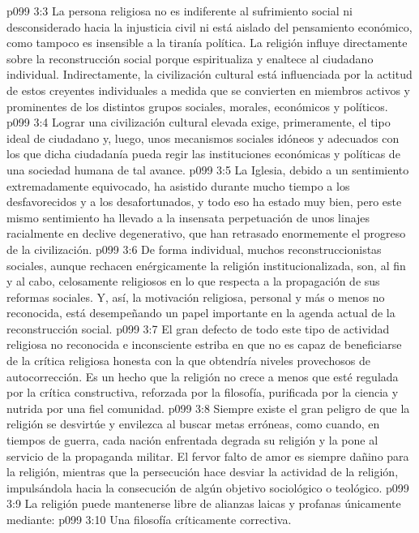 \vs p099 3:3 La persona religiosa no es indiferente al sufrimiento social ni desconsiderado hacia la injusticia civil ni está aislado del pensamiento económico, como tampoco es insensible a la tiranía política. La religión influye directamente sobre la reconstrucción social porque espiritualiza y enaltece al ciudadano individual. Indirectamente, la civilización cultural está influenciada por la actitud de estos creyentes individuales a medida que se convierten en miembros activos y prominentes de los distintos grupos sociales, morales, económicos y políticos.
\vs p099 3:4 \pc Lograr una civilización cultural elevada exige, primeramente, el tipo ideal de ciudadano y, luego, unos mecanismos sociales idóneos y adecuados con los que dicha ciudadanía pueda regir las instituciones económicas y políticas de una sociedad humana de tal avance.
\vs p099 3:5 La Iglesia, debido a un sentimiento extremadamente equivocado, ha asistido durante mucho tiempo a los desfavorecidos y a los desafortunados, y todo eso ha estado muy bien, pero este mismo sentimiento ha llevado a la insensata perpetuación de unos linajes racialmente en declive degenerativo, que han retrasado enormemente el progreso de la civilización.
\vs p099 3:6 De forma individual, muchos reconstruccionistas sociales, aunque rechacen enérgicamente la religión institucionalizada, son, al fin y al cabo, celosamente religiosos en lo que respecta a la propagación de sus reformas sociales. Y, así, la motivación religiosa, personal y más o menos no reconocida, está desempeñando un papel importante en la agenda actual de la reconstrucción social.
\vs p099 3:7 \pc El gran defecto de todo este tipo de actividad religiosa no reconocida e inconsciente estriba en que no es capaz de beneficiarse de la crítica religiosa honesta con la que obtendría niveles provechosos de autocorrección. Es un hecho que la religión no crece a menos que esté regulada por la crítica constructiva, reforzada por la filosofía, purificada por la ciencia y nutrida por una fiel comunidad.
\vs p099 3:8 Siempre existe el gran peligro de que la religión se desvirtúe y envilezca al buscar metas erróneas, como cuando, en tiempos de guerra, cada nación enfrentada degrada su religión y la pone al servicio de la propaganda militar. El fervor falto de amor es siempre dañino para la religión, mientras que la persecución hace desviar la actividad de la religión, impulsándola hacia la consecución de algún objetivo sociológico o teológico.
\vs p099 3:9 \pc La religión puede mantenerse libre de alianzas laicas y profanas únicamente mediante:
\vs p099 3:10 Una filosofía críticamente correctiva.
